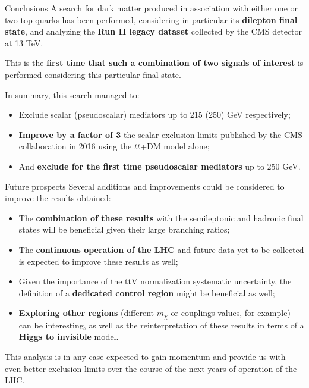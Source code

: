 \documentclass[8pt]{beamer}
\begin{document}
\begin{frame}{Conclusions}
\justifying
A search for \alert{dark matter produced in association with either one or two top quarks} has been performed, considering in particular its \textbf{dilepton final state}, and analyzing the \textbf{Run II legacy dataset} collected by the CMS detector at 13 TeV. \vfill

This is the \textbf{first time that such a combination of two signals of interest} is performed considering this particular final state. \vfill

In summary, this search managed to:
\begin{itemize}
\justifying
\item Exclude scalar (pseudoscalar) mediators up to 215 (250) GeV respectively;
\item \textbf{Improve by a factor of 3} the scalar exclusion limits published by the CMS collaboration in 2016 using the $t \bar t$+DM model alone;
\item And \textbf{exclude for the first time pseudoscalar mediators} up to 250 GeV.
\end{itemize} \vfill
\end{frame}

\begin{frame}{Future prospects}
\justifying
Several \alert{additions and improvements could be considered} to improve the results obtained:
\begin{itemize}
\justifying
\item The \textbf{combination of these results} with the semileptonic and hadronic final states will be beneficial given their large branching ratios;
\item The \textbf{continuous operation of the LHC} and future data yet to be collected is expected to improve these results as well;
\item Given the importance of the ttV normalization systematic uncertainty, the definition of a \textbf{dedicated control region} might be beneficial as well;
\item \textbf{Exploring other regions} (different $m_\chi$ or couplings values, for example) can be interesting, as well as the reinterpretation of these results in terms of a \textbf{Higgs to invisible} model.
\end{itemize} \vfill

This analysis is in any case \alert{expected to gain momentum and provide us with even better exclusion limits} over the course of the next years of operation of the LHC. \vfill
\end{frame}
\end{document}
